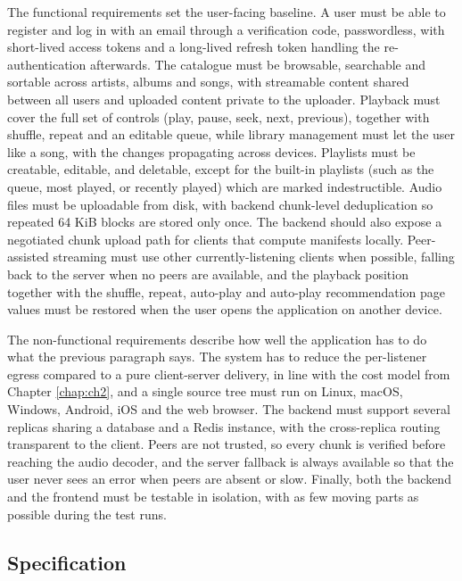 \indent \par The functional requirements set the user-facing baseline. A user must be able to register and log in with an email through a verification code, passwordless, with short-lived access tokens and a long-lived refresh token handling the re-authentication afterwards. The catalogue must be browsable, searchable and sortable across artists, albums and songs, with streamable content shared between all users and uploaded content private to the uploader. Playback must cover the full set of controls (play, pause, seek, next, previous), together with shuffle, repeat and an editable queue, while library management must let the user like a song, with the changes propagating across devices. Playlists must be creatable, editable, and deletable, except for the built-in playlists (such as the queue, most played, or recently played) which are marked indestructible. Audio files must be uploadable from disk, with backend chunk-level deduplication so repeated 64 KiB blocks are stored only once. The backend should also expose a negotiated chunk upload path for clients that compute manifests locally. Peer-assisted streaming must use other currently-listening clients when possible, falling back to the server when no peers are available, and the playback position together with the shuffle, repeat, auto-play and auto-play recommendation page values must be restored when the user opens the application on another device.


\indent \par The non-functional requirements describe how well the application has to do what the previous paragraph says. The system has to reduce the per-listener egress compared to a pure client-server delivery, in line with the cost model from Chapter \ref{chap:ch2}, and a single source tree must run on Linux, macOS, Windows, Android, iOS and the web browser. The backend must support several replicas sharing a database and a Redis instance, with the cross-replica routing transparent to the client. Peers are not trusted, so every chunk is verified before reaching the audio decoder, and the server fallback is always available so that the user never sees an error when peers are absent or slow. Finally, both the backend and the frontend must be testable in isolation, with as few moving parts as possible during the test runs.


\subsection{Specification}
\label{sec:specification}

